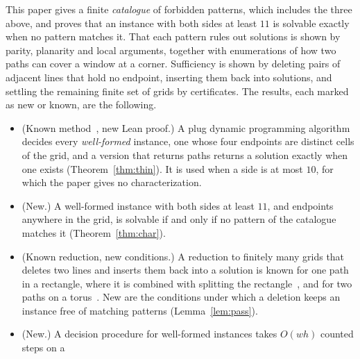 \documentclass[11pt]{article}
\begin{document}
This paper gives a finite \emph{catalogue} of forbidden patterns, which includes the three above,
and proves that an instance with both sides at least $11$ is solvable exactly when no pattern
matches it. That each pattern rules out solutions is shown by parity, planarity and local
arguments, together with enumerations of how two paths can cover a window at a corner.
Sufficiency is shown by deleting pairs of adjacent lines that hold no endpoint, inserting them
back into solutions, and settling the remaining finite set of grids by certificates. The results,
each marked as new or known, are the following.
\begin{itemize}
\item (Known method~\cite{chen08,jacobsen07}, new Lean proof.) A plug dynamic programming algorithm
  decides every \emph{well-formed} instance, one whose four endpoints are distinct cells of the
  grid, and a version that returns paths returns a solution exactly when one exists
  (Theorem~\ref{thm:thin}). It is used when a side is at most $10$, for which the paper gives no
  characterization.
\item (New.) A well-formed instance with both sides at least $11$, and endpoints anywhere in the
  grid, is solvable if and only if no pattern of the catalogue matches it
  (Theorem~\ref{thm:char}).
\item (Known reduction, new conditions.) A reduction to finitely many grids that deletes two
  lines and inserts them back into a solution is known for one path in a rectangle, where it is
  combined with splitting the rectangle~\cite{ips82}, and for two paths on a
  torus~\cite{makino06}. New are the conditions under which a deletion keeps an
  instance free of matching patterns (Lemma~\ref{lem:pass}).
\item (New.) A decision procedure for well-formed instances takes $O(wh)$ counted steps on a

\end{itemize}
\end{document}
